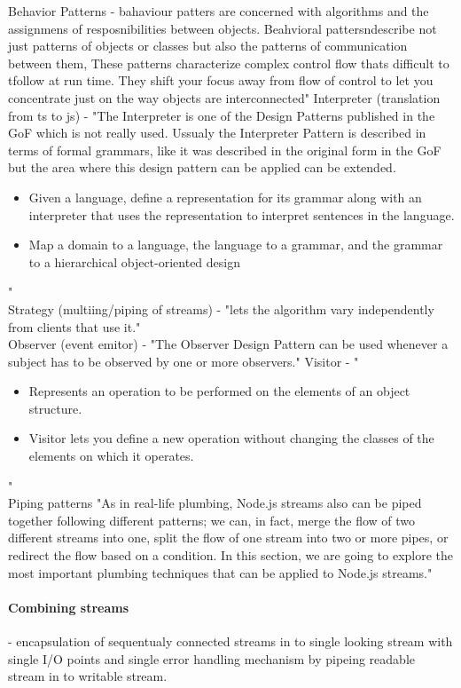 Behavior Patterns - bahaviour patters are concerned with algorithms and the assignmens of resposnibilities between objects. Beahvioral pattersndescribe not just patterns of objects or classes but also the patterns of communication between them, These patterns characterize complex control flow thats difficult to tfollow at run time. They shift your focus away from flow of control to let you concentrate just on the way objects are interconnected"\cite{DesignPatterns}
Interpreter (translation from ts to js) - "The Interpreter is one of the Design Patterns published in the GoF which is not really used. Ussualy the Interpreter Pattern is described in terms of formal grammars, like it was described in the original form in the GoF but the area where this design pattern can be applied can be extended.
\begin{itemize}
\item Given a language, define a representation for its grammar along with an interpreter that uses the representation to interpret sentences in the language.
\item Map a domain to a language, the language to a grammar, and the grammar to a hierarchical object-oriented design
\end{itemize}"\cite{oosite}\\
Strategy (multiing/piping of streams) - "lets the algorithm vary independently from clients that use it."\cite{oosite}\\
Observer (event emitor) - "The Observer Design Pattern can be used whenever a subject has to be observed by one or more observers."\cite{oosite}
Visitor  - "\begin{itemize}
\item Represents an operation to be performed on the elements of an object structure.
\item Visitor lets you define a new operation without changing the classes of the elements on which it operates.
\end{itemize}
"\cite{oosite}\\

Piping patterns
"As in real-life plumbing, Node.js streams also can be piped together following different patterns; we can, in fact, merge the flow of two different streams into one, split the flow of one stream into two or more pipes, or redirect the flow based on a condition. In this section, we are going to explore the most important plumbing techniques that can be applied to Node.js streams."\cite{nodejsbook}

\paragraph{Combining streams} - encapsulation of sequentualy connected streams in to single looking stream with single I/O points and single error handling mechanism by pipeing readable stream in to writable stream.\cite{nodejsbook}
